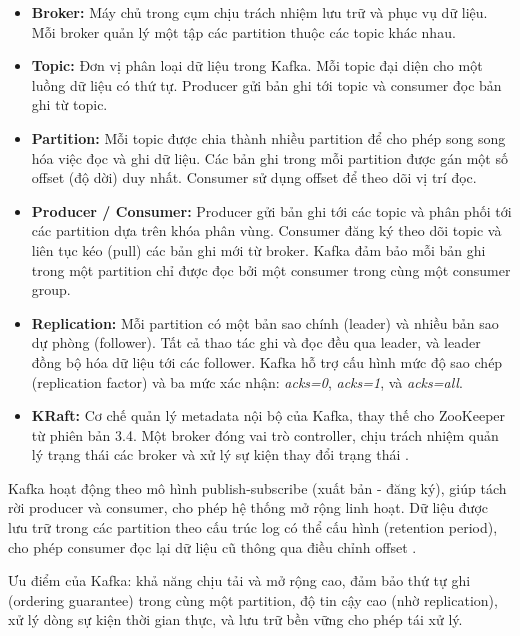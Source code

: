 \documentclass[../BTL.tex]{subfiles}
\begin{document}
\begin{itemize}
    \item \textbf{Broker:} Máy chủ trong cụm chịu trách nhiệm lưu trữ và phục vụ dữ liệu. Mỗi broker quản lý một tập các partition thuộc các topic khác nhau.

    \item \textbf{Topic:} Đơn vị phân loại dữ liệu trong Kafka. Mỗi topic đại diện cho một luồng dữ liệu có thứ tự. Producer gửi bản ghi tới topic và consumer đọc bản ghi từ topic.

    \item \textbf{Partition:} Mỗi topic được chia thành nhiều partition để cho phép song song hóa việc đọc và ghi dữ liệu. Các bản ghi trong mỗi partition được gán một số offset (độ dời) duy nhất. Consumer sử dụng offset để theo dõi vị trí đọc.

    \item \textbf{Producer / Consumer:} Producer gửi bản ghi tới các topic và phân phối tới các partition dựa trên khóa phân vùng. Consumer đăng ký theo dõi topic và liên tục kéo (pull) các bản ghi mới từ broker. Kafka đảm bảo mỗi bản ghi trong một partition chỉ được đọc bởi một consumer trong cùng một consumer group.

    \item \textbf{Replication:} Mỗi partition có một bản sao chính (leader) và nhiều bản sao dự phòng (follower). Tất cả thao tác ghi và đọc đều qua leader, và leader đồng bộ hóa dữ liệu tới các follower. Kafka hỗ trợ cấu hình mức độ sao chép (replication factor) và ba mức xác nhận: \textit{acks=0}, \textit{acks=1}, và \textit{acks=all}.

    \item \textbf{KRaft:} Cơ chế quản lý metadata nội bộ của Kafka, thay thế cho ZooKeeper từ phiên bản 3.4. Một broker đóng vai trò controller, chịu trách nhiệm quản lý trạng thái các broker và xử lý sự kiện thay đổi trạng thái \cite{kafka_internals}.
\end{itemize}

Kafka hoạt động theo mô hình publish-subscribe (xuất bản - đăng ký), giúp tách rời producer và consumer, cho phép hệ thống mở rộng linh hoạt. Dữ liệu được lưu trữ trong các partition theo cấu trúc log có thể cấu hình (retention period), cho phép consumer đọc lại dữ liệu cũ thông qua điều chỉnh offset \cite{kafka_definitive, streaming_systems}.

Ưu điểm của Kafka: khả năng chịu tải và mở rộng cao, đảm bảo thứ tự ghi (ordering guarantee) trong cùng một partition, độ tin cậy cao (nhờ replication), xử lý dòng sự kiện thời gian thực, và lưu trữ bền vững cho phép tái xử lý.
\end{document}
